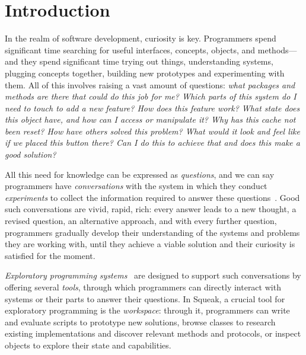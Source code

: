 

\chapter{Introduction}
\label{cha:introduction}

In the realm of software development, curiosity is key.
Programmers spend significant time searching for useful interfaces, concepts, objects, and methods---and they spend significant time trying out things, understanding systems, plugging concepts together, building new prototypes and experimenting with them.
All of this involves raising a vast amount of questions:
\emph{%
	what packages and methods are there that could do this job for me?
	Which parts of this system do I need to touch to add a new feature?
	How does this feature work?
	What state does this object have, and how can I access or manipulate it?
	Why has this cache not been reset?
	How have others solved this problem?
	What would it look and feel like if we placed this button there?
	Can I do this to achieve that and does this make a good solution?
}

All this need for knowledge can be expressed as \emph{questions}, and we can say programmers have \emph{conversations} with the system in which they conduct \emph{experiments} to collect the information required to answer these questions~\cite{taeumel2022pattern}.
Good such conversations are vivid, rapid, rich: every answer leads to a new thought, a revised question, an alternative approach, and with every further question, programmers gradually develop their understanding of the systems and problems they are working with, until they achieve a viable solution and their curiosity is satisfied for the moment.

\emph{Exploratory programming systems}~\cite{sandberg1988smalltalk,rein2018exploratory} are designed to support such conversations by offering several \emph{tools}, through which programmers can directly interact with systems or their parts to answer their questions.
In Squeak, a crucial tool for exploratory programming is the \emph{workspace}:
through it, programmers can write and evaluate scripts to prototype new solutions, browse classes to research existing implementations and discover relevant methods and protocols, or inspect objects to explore their state and capabilities.

